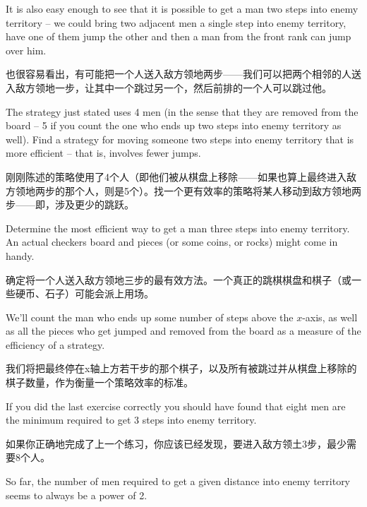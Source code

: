 It is also easy enough to see that it is possible to get a man
two steps into enemy territory -- we could bring two adjacent men
a single step into enemy territory, have one of them jump the other
and then a man from the front rank can jump over him.

也很容易看出，有可能把一个人送入敌方领地两步——我们可以把两个相邻的人送入敌方领地一步，让其中一个跳过另一个，然后前排的一个人可以跳过他。

\begin{exer}
The strategy just stated uses 4 men (in the sense that they are removed
from the board -- 5 if you count the one who ends up two steps into
enemy territory as well).
Find a strategy for moving someone two
steps into enemy territory that is more efficient -- that is, involves
fewer jumps.
\end{exer}

\begin{exer}
刚刚陈述的策略使用了4个人（即他们被从棋盘上移除——如果也算上最终进入敌方领地两步的那个人，则是5个）。找一个更有效率的策略将某人移动到敌方领地两步——即，涉及更少的跳跃。
\end{exer}

\begin{exer}
Determine the most efficient way to get a man three steps into
enemy territory.
An actual checkers board and pieces (or some 
coins, or rocks) might come in handy.
\end{exer}

\begin{exer}
确定将一个人送入敌方领地三步的最有效方法。一个真正的跳棋棋盘和棋子（或一些硬币、石子）可能会派上用场。
\end{exer}

We'll count the man who ends up some number of steps above the
$x$-axis, as well as all the pieces who get jumped and removed
from the board as a measure of the efficiency of a strategy.

我们将把最终停在x轴上方若干步的那个棋子，以及所有被跳过并从棋盘上移除的棋子数量，作为衡量一个策略效率的标准。

If you did the last exercise correctly you should have found that 
eight men are the minimum required to get 3 steps into enemy 
territory.

如果你正确地完成了上一个练习，你应该已经发现，要进入敌方领土3步，最少需要8个人。

So far, the number of men required to get a given
distance into enemy territory seems to always be a power of 
2.

